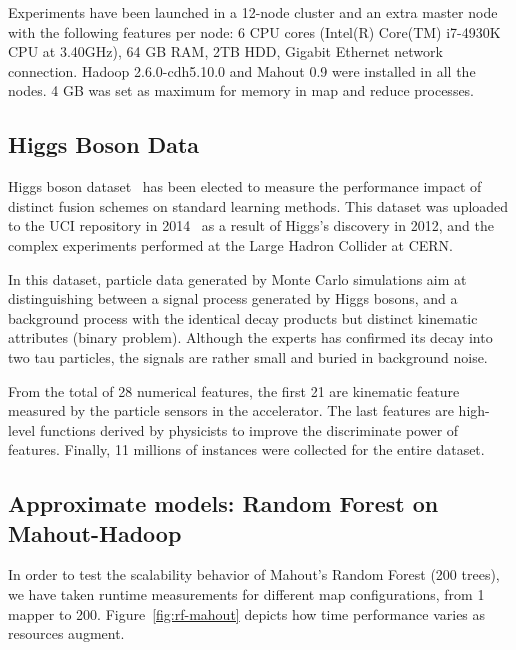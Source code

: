 \documentclass[3p,review]{elsarticle}
\begin{document}
Experiments have been launched in a 12-node cluster and an extra master node with the following features per node: 6 CPU cores (Intel(R) Core(TM) i7-4930K CPU at 3.40GHz), 64 GB RAM, 2TB HDD, Gigabit Ethernet network connection. Hadoop 2.6.0-cdh5.10.0 and Mahout 0.9 were installed in all the nodes. 4 GB was set as maximum for memory in map and reduce processes.

\subsection{Higgs Boson Data}
\label{subsec:datasets}

Higgs boson dataset~\cite{baldi14} has been elected to measure the performance impact of distinct fusion schemes on standard learning methods. This dataset was uploaded to the UCI repository in 2014~\cite{Lichman:2013} as a result of Higgs's discovery in 2012, and the complex experiments performed at the Large Hadron Collider at CERN. %

In this dataset, particle data generated by Monte Carlo simulations aim at distinguishing between a signal process generated by Higgs bosons, and a background process with the identical decay products but distinct kinematic attributes (binary problem). Although the experts has confirmed its decay into two tau particles, the signals are rather small and buried in background noise. 

From the total of 28 numerical features, the first 21 are kinematic feature measured by the particle sensors in the accelerator. The last features are high-level functions derived by physicists to improve the discriminate power of features. Finally, 11 millions of instances were collected for the entire dataset.

\subsection{Approximate models: Random Forest on Mahout-Hadoop}
\label{subsec:rfmahout}

In order to test the scalability behavior of Mahout's Random Forest (200 trees), we have taken runtime measurements for different map configurations, from 1 mapper to 200. Figure~\ref{fig:rf-mahout} depicts how time performance varies as resources augment.
\end{document}
